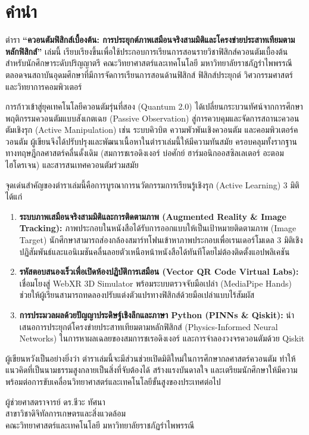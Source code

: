 \chapter*{คำนำ}

ตำรา \textbf{“ควอนตัมฟิสิกส์เบื้องต้น: การประยุกต์ภาพเสมือนจริงสามมิติและโครงข่ายประสาทเทียมตามหลักฟิสิกส์”} เล่มนี้ เรียบเรียงขึ้นเพื่อใช้ประกอบการเรียนการสอนรายวิชาฟิสิกส์ควอนตัมเบื้องต้น สำหรับนักศึกษาระดับปริญญาตรี คณะวิทยาศาสตร์และเทคโนโลยี มหาวิทยาลัยราชภัฏรำไพพรรณี ตลอดจนสถาบันอุดมศึกษาที่มีการจัดการเรียนการสอนด้านฟิสิกส์ ฟิสิกส์ประยุกต์ วิศวกรรมศาสตร์ และวิทยาการคอมพิวเตอร์

การก้าวเข้าสู่ยุคเทคโนโลยีควอนตัมรุ่นที่สอง (Quantum 2.0) ได้เปลี่ยนกระบวนทัศน์จากการศึกษาพฤติกรรมควอนตัมแบบสังเกตเฉย (Passive Observation) สู่การควบคุมและจัดการสถานะควอนตัมเชิงรุก (Active Manipulation) เช่น ระบบคิวบิต ความพัวพันเชิงควอนตัม และคอมพิวเตอร์ควอนตัม ผู้เขียนจึงได้ปรับปรุงและพัฒนาเนื้อหาในตำราเล่มนี้ให้มีความทันสมัย ครอบคลุมทั้งรากฐานทางทฤษฎีกลศาสตร์คลื่นดั้งเดิม (สมการชเรอดิงเงอร์ บ่อศักย์ ฮาร์มอนิกออสซิลเลเตอร์ อะตอมไฮโดรเจน) และสารสนเทศควอนตัมร่วมสมัย

จุดเด่นสำคัญของตำราเล่มนี้คือการบูรณาการนวัตกรรมการเรียนรู้เชิงรุก (Active Learning) 3 มิติ ได้แก่
\begin{enumerate}
    \item \textbf{ระบบภาพเสมือนจริงสามมิติและการติดตามภาพ (Augmented Reality \& Image Tracking):} ภาพประกอบในหนังสือได้รับการออกแบบให้เป็นเป้าหมายติดตามภาพ (Image Target) นักศึกษาสามารถส่องกล้องสมาร์ทโฟนเข้าหาภาพประกอบเพื่อเรนเดอร์โมเดล 3 มิติเชิงปฏิสัมพันธ์และแอนิเมชันคลื่นลอยตัวเหนือหน้าหนังสือได้ทันทีโดยไม่ต้องติดตั้งแอปพลิเคชัน
    \item \textbf{รหัสตอบสนองเร็วเพื่อเปิดห้องปฏิบัติการเสมือน (Vector QR Code Virtual Labs):} เชื่อมโยงสู่ WebXR 3D Simulator พร้อมระบบตรวจจับมือเปล่า (MediaPipe Hands) ช่วยให้ผู้เรียนสามารถทดลองปรับแต่งตัวแปรทางฟิสิกส์ด้วยมือเปล่าแบบไร้สัมผัส
    \item \textbf{การประมวลผลด้วยปัญญาประดิษฐ์เชิงลึกและภาษา Python (PINNs \& Qiskit):} นำเสนอการประยุกต์โครงข่ายประสาทเทียมตามหลักฟิสิกส์ (Physics-Informed Neural Networks) ในการหาผลเฉลยของสมการชเรอดิงเงอร์ และการจำลองวงจรควอนตัมด้วย Qiskit
\end{enumerate}

ผู้เขียนหวังเป็นอย่างยิ่งว่า ตำราเล่มนี้จะมีส่วนช่วยเปิดมิติใหม่ในการศึกษากลศาสตร์ควอนตัม ทำให้แนวคิดที่เป็นนามธรรมสูงกลายเป็นสิ่งที่จับต้องได้ สร้างแรงบันดาลใจ และเตรียมนักศึกษาให้มีความพร้อมต่อการขับเคลื่อนวิทยาศาสตร์และเทคโนโลยีขั้นสูงของประเทศต่อไป

\vspace{1.5cm}
\begin{flushright}
    ผู้ช่วยศาสตราจารย์ ดร.ชีวะ ทัศนา\\
    สาขาวิชาดิจิทัลการเกษตรและสิ่งแวดล้อม\\
    คณะวิทยาศาสตร์และเทคโนโลยี มหาวิทยาลัยราชภัฏรำไพพรรณี
\end{flushright}
